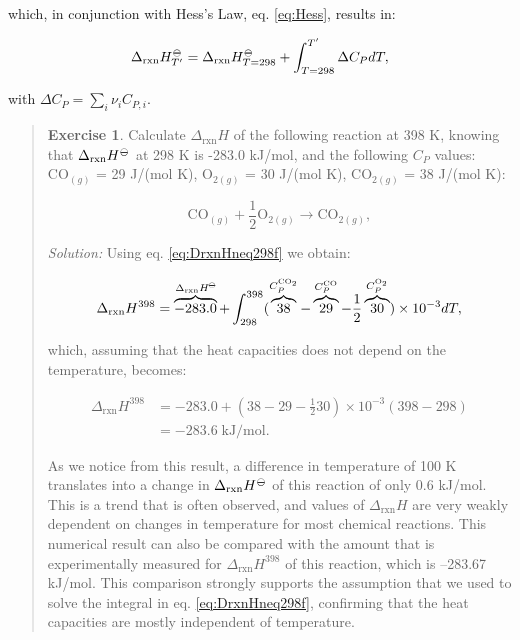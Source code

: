 \documentclass[
  9pt,
]{extbook}
\theoremstyle{definition}
\theoremstyle{definition}
\theoremstyle{definition}
\newtheorem{exercise}{Exercise}[chapter]
\theoremstyle{definition}
\theoremstyle{remark}
\begin{document}
which, in conjunction with Hess's Law, eq. \eqref{eq:Hess}, results in:

\begin{equation}
 \Delta_{\text{rxn}} H_{T'}^{-\kern-6pt{\ominus}\kern-6pt-}= \Delta_{\text{rxn}} H_{T=298}^{-\kern-6pt{\ominus}\kern-6pt-}+ \int_{T=298}^{T'} \Delta C_P dT,
  \label{eq:DrxnHneq298f}
\end{equation}

with \(\Delta C_P = \sum_i \nu_i C_{P,i}\).

\begin{quote}
\begin{exercise}
\protect\hypertarget{exr:DHtdiff298}{}\label{exr:DHtdiff298}Calculate \(\Delta_{\text{rxn}}H\) of the following reaction at 398 K, knowing that \(\Delta_{\text{rxn}}H^{-\kern-6pt{\ominus}\kern-6pt-}\) at 298 K is -283.0 kJ/mol, and the following \(C_P\) values: \(\mathrm{CO}_{(g)}\) = 29 J/(mol K), \(\mathrm{O}_{2(g)}\) = 30 J/(mol K), \(\mathrm{CO}_{2(g)}\) = 38 J/(mol K):

\[
\mathrm{CO}_{(g)}+\frac{1}{2}\mathrm{O}_{2(g)} \rightarrow \mathrm{CO}_{2(g)},
\]

\emph{Solution:} Using eq. \eqref{eq:DrxnHneq298f} we obtain:

\[
 \Delta_{\text{rxn}} H^{398} = \overbrace{-283.0}^{\Delta_{\text{rxn}}H^{-\kern-6pt{\ominus}\kern-6pt-}} + \int_{298}^{398} ( \overbrace{38}^{C_P^{\mathrm{CO}_2}} -\overbrace{29}^{C_P^{\mathrm{CO}}} -\frac{1}{2}\overbrace{30}^{C_P^{\mathrm{O}_2}} ) \times 10^{-3} dT,
\]

which, assuming that the heat capacities does not depend on the temperature, becomes:

\begin{equation}
\begin{aligned}
 \Delta_{\text{rxn}} H^{398} &= -283.0 + \left(38-29-\frac{1}{2}30 \right) \times 10^{-3} (398-298) \\ &= -283.6 \; \text{kJ/mol}.
\end{aligned}
\end{equation}

As we notice from this result, a difference in temperature of 100 K translates into a change in \(\Delta_{\text{rxn}}H^{-\kern-6pt{\ominus}\kern-6pt-}\) of this reaction of only 0.6 kJ/mol. This is a trend that is often observed, and values of \(\Delta_{\text{rxn}}H\) are very weakly dependent on changes in temperature for most chemical reactions. This numerical result can also be compared with the amount that is experimentally measured for \(\Delta_{\text{rxn}}H^{398}\) of this reaction, which is --283.67 kJ/mol. This comparison strongly supports the assumption that we used to solve the integral in eq. \eqref{eq:DrxnHneq298f}, confirming that the heat capacities are mostly independent of temperature.
\end{exercise}
\end{quote}
\end{document}
